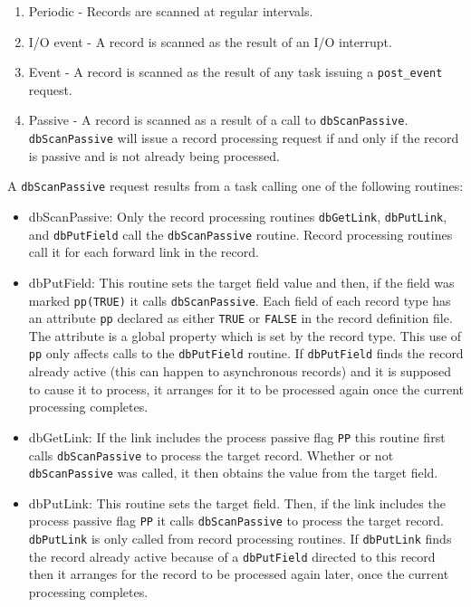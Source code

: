 \begin{enumerate}
\item {}Periodic - Records are scanned at regular intervals.

\item {}I/O event - A record is scanned as the result of an I/O interrupt.

\item {}Event - A record is scanned as the result of any task issuing a \verb|post_event| request.

\item {}Passive - A record is scanned as a result of a call to \verb|dbScanPassive|.
\verb|dbScanPassive| will issue a record processing request if and only if the record is passive and is not already being processed.

\end{enumerate}

A \verb|dbScanPassive| request results from a task calling one of the following routines:

\begin{itemize}
\item {}dbScanPassive: Only the record processing routines \verb|dbGetLink|, \verb|dbPutLink|, and \verb|dbPutField| call the \verb|dbScanPassive| routine.
Record processing routines call it for each forward link in the record.

\item {}dbPutField: This routine sets the target field value and then, if the field was marked \verb|pp(TRUE)| it calls \verb|dbScanPassive|.
Each field of each record type has an attribute \verb|pp| declared as either \verb|TRUE| or \verb|FALSE| in the record definition file.
The attribute is a global property which is set by the record type.
This use of \verb|pp| only affects calls to the \verb|dbPutField| routine.
If \verb|dbPutField| finds the record already active (this can happen to asynchronous records) and it is supposed to cause it to process, it arranges for it to be processed again once the current processing completes.

\item {}dbGetLink:  If the link includes the process passive flag \verb|PP| this routine first calls \verb|dbScanPassive| to process the target record.
Whether or not \verb|dbScanPassive| was called, it then obtains the value from the target field.

\item {}dbPutLink:  This routine sets the target field.
Then, if the link includes the process passive flag \verb|PP| it calls \verb|dbScanPassive| to process the target record.
\verb|dbPutLink| is only called from record processing routines.
If \verb|dbPutLink| finds the record already active because of a \verb|dbPutField| directed to this record then it arranges for the record to be processed again later, once the current processing completes.

\end{itemize}


